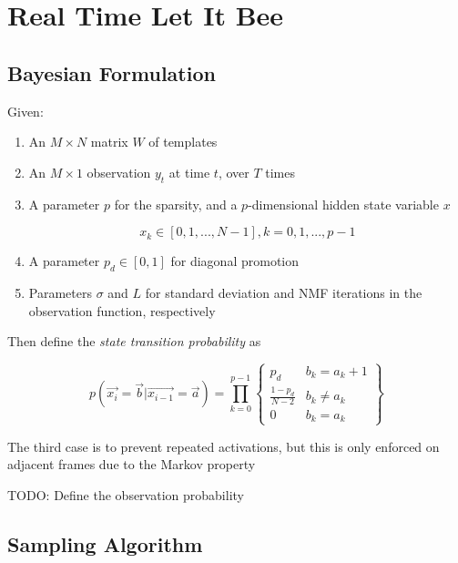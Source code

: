 \documentclass{article}
\begin{document}
\section{Real Time Let It Bee}

\subsection{Bayesian Formulation}

    Given:
    \begin{enumerate}
        \item
            An $M \times N$ matrix $W$ of templates
        
        \item
            An $M \times 1$ observation $y_t$ at time $t$, over $T$ times
        
        \item
            A parameter $p$ for the sparsity, and a $p$-dimensional hidden state variable $x$

                \[ x_k \in [0, 1, ..., N-1], k = 0, 1, ..., p-1 \]
        
        \item
            A parameter $p_d \in [0, 1]$ for diagonal promotion
        
        \item
            Parameters $\sigma$ and $L$ for standard deviation and NMF iterations in the observation function, respectively
        
    \end{enumerate}

        Then define the {\em state transition probability} as 

		\begin{equation}
        	p(\vec{x_i} = \vec{b} | \vec{x_{i-1}} = \vec{a}) = \prod_{k=0}^{p-1} \left\{  \begin{array}{cc}  p_d & b_k = a_k+1  \\ \frac{1-p_d}{N-2} & b_k \neq a_k \\ 0 & b_k = a_k \end{array} \right\}
		\end{equation}

    
        The third case is to prevent repeated activations, but this is only enforced on adjacent frames due to the Markov property

		TODO: Define the observation probability


\subsection{Sampling Algorithm}
\end{document}
